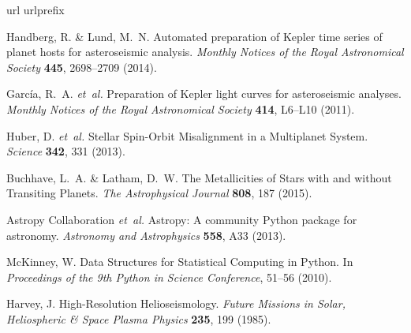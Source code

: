 \begin{thebibliography}{10}
\expandafter\ifx\csname url\endcsname\relax
\def\url#1{\texttt{#1}}\fi
\expandafter\ifx\csname urlprefix\endcsname\relax\def\urlprefix{URL }\fi
\providecommand{\bibinfo}[2]{#2}
\providecommand{\eprint}[2][]{\url{#2}}
	
	
\bibinfo{author}{Handberg, R.} \& \bibinfo{author}{Lund, M.~N.}
\newblock \bibinfo{title}{Automated preparation of {{Kepler}} time series of
  planet hosts for asteroseismic analysis}.
\newblock \emph{\bibinfo{journal}{Monthly Notices of the Royal Astronomical
  Society}} \textbf{\bibinfo{volume}{445}}, \bibinfo{pages}{2698--2709}
  (\bibinfo{year}{2014}).

\bibinfo{author}{Garc{\'i}a, R.~A.} \emph{et~al.}
\newblock \bibinfo{title}{Preparation of {{Kepler}} light curves for
  asteroseismic analyses}.
\newblock \emph{\bibinfo{journal}{Monthly Notices of the Royal Astronomical
  Society}} \textbf{\bibinfo{volume}{414}}, \bibinfo{pages}{L6--L10}
  (\bibinfo{year}{2011}).

\bibinfo{author}{Huber, D.} \emph{et~al.}
\newblock \bibinfo{title}{Stellar {{Spin}}-{{Orbit Misalignment}} in a
  {{Multiplanet System}}}.
\newblock \emph{\bibinfo{journal}{Science}} \textbf{\bibinfo{volume}{342}},
  \bibinfo{pages}{331} (\bibinfo{year}{2013}).

\bibinfo{author}{Buchhave, L.~A.} \& \bibinfo{author}{Latham, D.~W.}
\newblock \bibinfo{title}{The {{Metallicities}} of {{Stars}} with and without
  {{Transiting Planets}}}.
\newblock \emph{\bibinfo{journal}{The Astrophysical Journal}}
  \textbf{\bibinfo{volume}{808}}, \bibinfo{pages}{187} (\bibinfo{year}{2015}).

\bibinfo{author}{{Astropy Collaboration}} \emph{et~al.}
\newblock \bibinfo{title}{Astropy: {{A}} community {{Python}} package for
  astronomy}.
\newblock \emph{\bibinfo{journal}{Astronomy and Astrophysics}}
  \textbf{\bibinfo{volume}{558}}, \bibinfo{pages}{A33} (\bibinfo{year}{2013}).

\bibinfo{author}{McKinney, W.}
\newblock \bibinfo{title}{Data {{Structures}} for {{Statistical Computing}} in
  {{Python}}}.
\newblock In \emph{\bibinfo{booktitle}{Proceedings of the 9th {{Python}} in
  {{Science Conference}}}}, \bibinfo{pages}{51--56} (\bibinfo{year}{2010}).

\bibinfo{author}{Harvey, J.}
\newblock \bibinfo{title}{High-{{Resolution Helioseismology}}}.
\newblock \emph{\bibinfo{journal}{Future Missions in Solar, Heliospheric \&
  Space Plasma Physics}} \textbf{\bibinfo{volume}{235}}, \bibinfo{pages}{199}
  (\bibinfo{year}{1985}).


\end{thebibliography}

